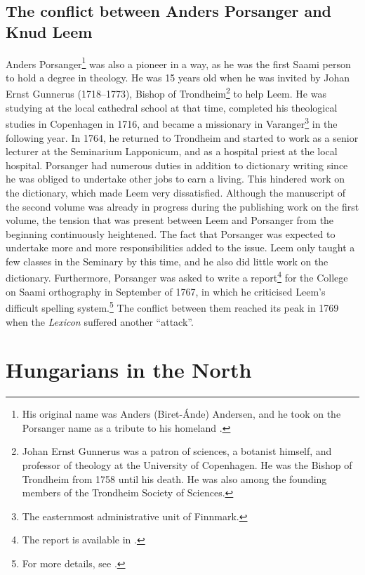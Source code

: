 \documentclass[output=paper,colorlinks,citecolor=brown,arabicfont,chinesefont]{langscibook}
\begin{document}
\subsection{The conflict between Anders Porsanger and Knud Leem}

Anders Porsanger\footnote{His original name was Anders (Biret\hyp Ánde) Andersen, and he took on the Porsanger name as a tribute to his homeland \citep[9]{Solbakk1998}.} was also a pioneer in a way, as he was the first Saami person to hold a degree in theology. He was 15 years old when he was invited by Johan Ernst Gunnerus (1718–1773), Bishop of Trondheim\footnote{Johan Ernst Gunnerus was a patron of sciences, a botanist himself, and professor of theology at the University of Copenhagen. He was the Bishop of Trondheim from 1758 until his death. He was also among the founding members of the Trondheim Society of Sciences.} to help Leem. He was studying at the local cathedral school at that time, completed his theological studies in Copenhagen in 1716, and became a missionary in Varanger\footnote{The easternmost administrative unit of Finnmark.} in the following year. In 1764,  he returned to Trondheim and started to work as a senior lecturer at the Seminarium Lapponicum, and as a hospital priest at the local hospital. Porsanger had numerous duties in addition to dictionary writing since he was obliged to undertake other jobs to earn a living. This hindered work on the dictionary, which made Leem very dissatisfied. Although the manuscript of the second volume was already in progress during the publishing work on the first volume, the tension that was present between Leem and Porsanger from the beginning continuously heightened. The fact that Porsanger was expected to undertake more and more responsibilities added to the issue. Leem only taught a few classes in the Seminary by this time, and he also did little work on the dictionary. Furthermore, Porsanger was asked to write a report\footnote{The report is available in \citet{Martinussen1992}.} for the College on Saami orthography in September of 1767, in which he criticised Leem’s difficult spelling system.\footnote{For more details, see \citet{Kelemen2019}.} The conflict between them reached its peak in 1769 when the \emph{Lexicon} suffered another “attack”.

\section{Hungarians in the North}
\end{document}
